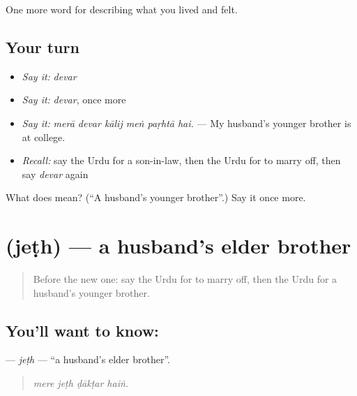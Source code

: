 \begin{grammarlens}[title={What you've built}]
One more word for describing what you lived and felt.
\end{grammarlens}

\subsection*{Your turn}
\begin{itemize}
\raggedright
  \item \emph{Say it:} \emph{devar}
  \item \emph{Say it:} \emph{devar}, once more
  \item \emph{Say it:} \emph{merā devar kālij meṅ paṛhtā hai.} — My husband's younger brother is at college.
  \item \emph{Recall:} say the Urdu for a son-in-law, then the Urdu for to marry off, then say \emph{devar} again
\end{itemize}

\begin{tcolorbox}[breakable,colback=teal!4,colframe=teal!35!black,title={Before you move on}]
What does  mean? (\textquotedblleft{}A husband's younger brother\textquotedblright{}.) Say it once more.
\end{tcolorbox}
\section[\texorpdfstring{\ur{جیٹھ} (jeṭh)}{جیٹھ (jeṭh)}]{ (jeṭh) — a husband's elder brother}

\label{lesson:UR-C489-jeth}



\begin{quote}
Before the new one: say the Urdu for to marry off, then the Urdu for a husband's younger brother.
\end{quote}

\subsection*{You'll want to know: }
\textbf{} — \emph{jeṭh} — \textquotedblleft{}a husband's elder brother\textquotedblright{}.

\begin{quote}
   
\end{quote}

\begin{quote}
\emph{mere jeṭh ḍākṭar haiṅ.}
\end{quote}

